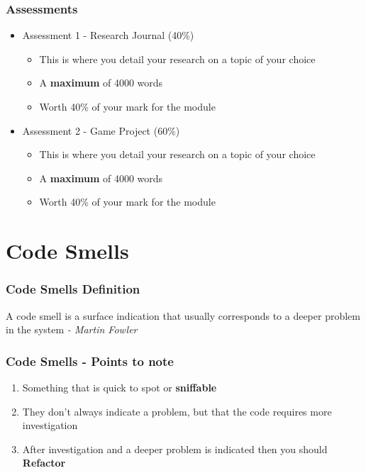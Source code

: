 \begin{frame}
\begin{frame}
	\frametitle{Assessments}
	\begin{itemize}
		\item Assessment 1 - Research Journal (40\%)
		\begin{itemize}
			\item This is where you detail your research on a topic of your choice
			\item A \textbf{maximum} of 4000 words
			\item Worth 40\% of your mark for the module
		\end{itemize}
		\item Assessment 2 - Game Project (60\%)
		\begin{itemize}
			\item This is where you detail your research on a topic of your choice
		\item A \textbf{maximum} of 4000 words
		\item Worth 40\% of your mark for the module
		\end{itemize}		
	\end{itemize}
\end{frame}

\section{Code Smells}

\begin{frame}
\frametitle{Code Smells Definition}
\begin{center}
	A code smell is a surface indication that usually corresponds to a deeper problem in the system \linebreak \linebreak 
	\small{\textit{- Martin Fowler}}
\end{center}
\end{frame}

\begin{frame}
\frametitle{Code Smells - Points to note}
\begin{enumerate}
	\item Something that is quick to spot or \textbf{sniffable}
	\item They don't always indicate a problem, but that the code requires more investigation
	\item After investigation and a deeper problem is indicated then you should \textbf{Refactor}
\end{enumerate}
\end{frame}


\end{frame}
